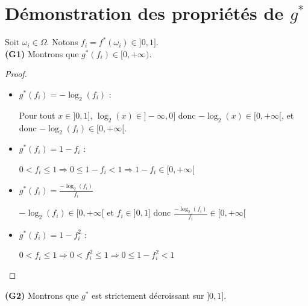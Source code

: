 \documentclass[a4paper]{article}
\begin{document}
\section{Démonstration des propriétés de $g^*$}
\label{appendix:demo-g}

Soit $\omega_i \in \Omega$. Notons $f_i = f^*(\omega_i) \in ]0,1]$. \\

\textbf{(G1)} Montrons que $g^*(f_i) \in [0, +\infty)$.

\begin{proof}
\begin{itemize}
    \item $g^*(f_i) = -\log_{2}(f_i)$ :

        Pour tout $x \in ]0,1]$, $\log_{2}(x) \in ]-\infty, 0]$ donc $-\log_{2}(x)
        \in [0,+\infty[$, et donc $-\log_{2}(f_i) \in [0,+\infty[$.

    \item $g^*(f_i) = 1 - f_i$ : 

        $0 < f_i \leq 1 \Rightarrow 0 \leq 1-f_i < 1 \Rightarrow 1-f_i \in
        [0,+\infty[$

    \item $g^*(f_i) = \frac{-\log_{2}(f_i)}{f_i}$

        $-\log_{2}(f_i) \in [0,+\infty[$ et $f_i \in ]0,1]$ donc
        $\frac{-\log_{2}(f_i)}{f_i} \in [0,+\infty[$

    \item $g^*(f_i) = 1-f_i^2$ :

        $0 < f_i \leq 1 \Rightarrow 0 < f_i^2 \leq 1 \Rightarrow 0 \leq 1-f_i^2
        < 1$

\end{itemize}
\end{proof}

\textbf{(G2)} Montrons que $g^*$ est strictement décroissant sur $]0,1]$.
\end{document}
